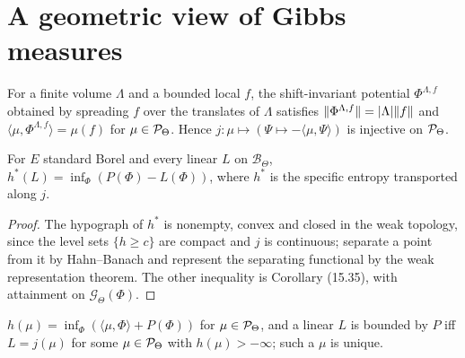 \section{A geometric view of Gibbs measures}

\begin{definition}
    \label{def:gv-16-10}
    \leanok

    For a finite volume $\Lambda$ and a bounded local $f$, the shift-invariant potential
    $\Phi^{\Lambda,f}$ obtained by spreading $f$ over the translates of $\Lambda$ satisfies
    $\lVert \Phi^{\Lambda,f}\rVert = \lvert \Lambda\rvert\lVert f\rVert$ and $\langle\mu,\Phi^{\Lambda,f}\rangle =
    \mu(f)$ for $\mu \in \mathcal{P}_\Theta$. Hence $j : \mu \mapsto (\Psi \mapsto -\langle\mu,\Psi\rangle)$
    is injective on $\mathcal{P}_\Theta$.
\end{definition}

\begin{theorem}[Georgii (16.11)]
    \label{thm:gv-16-11}
    \leanok

    For $E$ standard Borel and every linear $L$ on $\mathcal B_\Theta$,
    $h^*(L) = \inf_\Phi (P(\Phi) - L(\Phi))$, where $h^*$ is the specific entropy transported
    along $j$.
\end{theorem}
\begin{proof}
    \leanok
    The hypograph of $h^*$ is nonempty, convex and closed in the weak topology, since the level
    sets $\{h \geq c\}$ are compact and $j$ is continuous; separate a point from it by
    Hahn--Banach and represent the separating functional by the weak representation theorem. The
    other inequality is Corollary (15.35), with attainment on $\mathcal G_\Theta(\Phi)$.
\end{proof}

\begin{corollary}[Georgii (16.12), (16.13)]
    \label{cor:gv-16-12}
    \leanok

    $h(\mu) = \inf_\Phi (\langle\mu,\Phi\rangle + P(\Phi))$ for $\mu \in \mathcal{P}_\Theta$, and a
    linear $L$ is bounded by $P$ iff $L = j(\mu)$ for some $\mu \in \mathcal{P}_\Theta$ with
    $h(\mu) > -\infty$; such a $\mu$ is unique.
\end{corollary}

